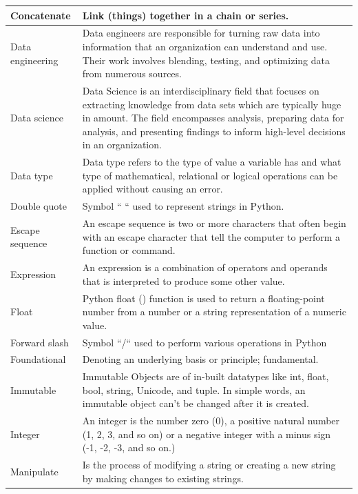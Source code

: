 \documentclass[../../data_analysis_python.tex]{subfiles}
\begin{document}
\begin{longtable}{p{3cm} p{12cm}}
        \hline 
        Concatenate & Link (things) together in a chain or series. \\ 
        \hline 
        Data engineering & Data engineers are responsible for turning raw data into information that an organization can understand and use. Their work involves blending, testing, and optimizing data from numerous sources. \\ 
        \hline 
        Data science & Data Science is an interdisciplinary field that focuses on extracting knowledge from data sets which are typically huge in amount. The field encompasses analysis, preparing data for analysis, and presenting findings to inform high-level decisions in an organization. \\ 
        \hline 
        Data type & Data type refers to the type of value a variable has and what type of mathematical, relational or logical operations can be applied without causing an error. \\ 
        \hline 
        Double quote & Symbol “ “ used to represent strings in Python. \\ 
        \hline 
        Escape sequence & An escape sequence is two or more characters that often begin with an escape character that tell the computer to perform a function or command. \\ 
        \hline 
        Expression & An expression is a combination of operators and operands that is interpreted to produce some other value. \\ 
        \hline 
        Float & Python float () function is used to return a floating-point number from a number or a string representation of a numeric value. \\ 
        \hline 
        Forward slash & Symbol “/“ used to perform various operations in Python \\ 
        \hline 
        Foundational & Denoting an underlying basis or principle; fundamental. \\ 
        \hline 
        Immutable & Immutable Objects are of in-built datatypes like int, float, bool, string, Unicode, and tuple. In simple words, an immutable object can’t be changed after it is created. \\ 
        \hline 
        Integer & An integer is the number zero (0), a positive natural number (1, 2, 3, and so on) or a negative integer with a minus sign (-1, -2, -3, and so on.) \\ 
        \hline 
        Manipulate & Is the process of modifying a string or creating a new string by making changes to existing strings. \\ 

\end{longtable}
\end{document}
